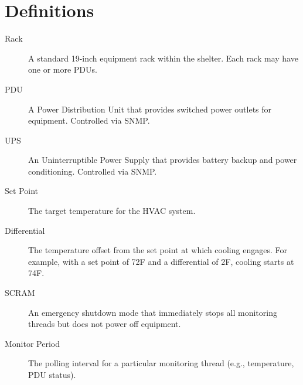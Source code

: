 \section{Definitions}

\begin{description}
    \item[Rack] A standard 19-inch equipment rack within the shelter. Each rack may have one or more PDUs.

    \item[PDU] A Power Distribution Unit that provides switched power outlets for equipment. Controlled via SNMP.

    \item[UPS] An Uninterruptible Power Supply that provides battery backup and power conditioning.  Controlled via SNMP.

    \item[Set Point] The target temperature for the HVAC system.

    \item[Differential] The temperature offset from the set point at which cooling engages. For example, with a set point of 72\textdegree F and a differential of 2\textdegree F, cooling starts at 74\textdegree F.

    \item[SCRAM] An emergency shutdown mode that immediately stops all monitoring threads but does not power off equipment.

    \item[Monitor Period] The polling interval for a particular monitoring thread (e.g., temperature, PDU status).
\end{description}
